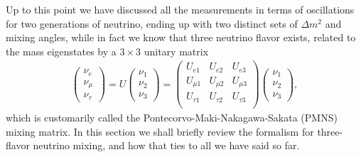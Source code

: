 Up to this point we have discussed all the measurements in terms of oscillations
for two generations of neutrino, ending up with two distinct sets of $\Delta m^2$
and mixing angles, while in fact we know that three neutrino flavor exists, related
to the mass eigenstates by a $3 \times 3$ unitary matrix
\begin{align*}
  \begin{pmatrix}\nu_e\\ \nu_\mu\\ \nu_\tau  \end{pmatrix} = U
  \begin{pmatrix}\nu_1\\ \nu_2\\ \nu_3 \end{pmatrix} =
  \begin{pmatrix}
    U_{e1} & U_{e2} & U_{e3}\\
    U_{\mu 1} & U_{\mu 2} & U_{\mu 3}\\
    U_{\tau 1} & U_{\tau 2} & U_{\tau 3}\\
  \end{pmatrix}
  \begin{pmatrix}\nu_1\\ \nu_2\\ \nu_3 \end{pmatrix},
\end{align*}
which is customarily called the Pontecorvo-Maki-Nakagawa-Sakata (PMNS) mixing matrix.
In this section we shall briefly review the formalism for three-flavor neutrino
mixing, and how that ties to all we have said so far.

